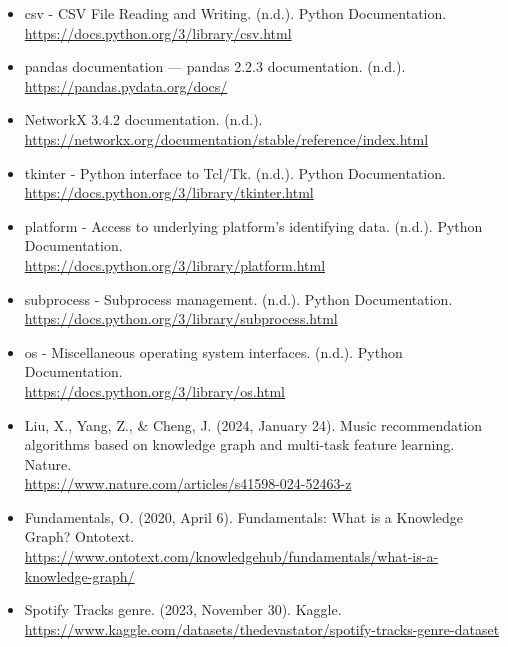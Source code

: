 \documentclass[fontsize=11pt]{article}
\numberwithin{equation}{section}
\theoremstyle{plain} %
\theoremstyle{definition}
\theoremstyle{remark}
\begin{document}
\begin{itemize}
\item csv - CSV File Reading and Writing. (n.d.). Python Documentation.\\ \url{https://docs.python.org/3/library/csv.html}


\item pandas documentation — pandas 2.2.3 documentation. (n.d.).\\
\url{https://pandas.pydata.org/docs/}


\item NetworkX 3.4.2 documentation. (n.d.).\\
\url{https://networkx.org/documentation/stable/reference/index.html}


\item tkinter - Python interface to Tcl/Tk. (n.d.). Python Documentation. \\
\url{https://docs.python.org/3/library/tkinter.html}


\item platform - Access to underlying platform’s identifying data. (n.d.). Python Documentation.\\ \url{https://docs.python.org/3/library/platform.html}


\item subprocess - Subprocess management. (n.d.). Python Documentation.\\
\url{https://docs.python.org/3/library/subprocess.html}


\item os - Miscellaneous operating system interfaces. (n.d.). Python Documentation.\\ 
\url{https://docs.python.org/3/library/os.html}


\item Liu, X., Yang, Z., \& Cheng, J. (2024, January 24). Music recommendation algorithms based on knowledge graph and multi-task feature learning. Nature. \\
\url{https://www.nature.com/articles/s41598-024-52463-z}


\item Fundamentals, O. (2020, April 6). Fundamentals: What is a Knowledge Graph? Ontotext. \\ 
\url{https://www.ontotext.com/knowledgehub/fundamentals/what-is-a-knowledge-graph/}


\item Spotify Tracks genre. (2023, November 30). Kaggle. \\
\url{https://www.kaggle.com/datasets/thedevastator/spotify-tracks-genre-dataset}
\end{itemize}

\end{document}
